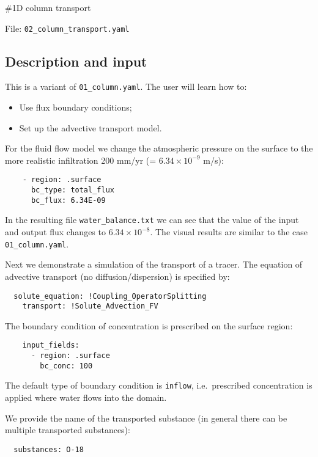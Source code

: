 \#1D column transport

File: \texttt{02\_column\_transport.yaml}

\subsection{Description and input}

This is a variant of \texttt{01\_column.yaml}. The user will learn how
to:

\begin{itemize}
\tightlist
\item
  Use flux boundary conditions;
\item
  Set up the advective transport model.
\end{itemize}

For the fluid flow model we change the atmospheric pressure on the
surface to the more realistic infiltration 200 mm/yr (=
\(6.34\times 10^{-9}\) m/s):

\begin{verbatim}
    - region: .surface
      bc_type: total_flux
      bc_flux: 6.34E-09
\end{verbatim}

In the resulting file \texttt{water\_balance.txt} we can see that the
value of the input and output flux changes to \(6.34 \times 10^{-8}\).
The visual results are similar to the case \texttt{01\_column.yaml}.

Next we demonstrate a simulation of the transport of a tracer. The
equation of advective transport (no diffusion/dispersion) is specified
by:

\begin{verbatim}
  solute_equation: !Coupling_OperatorSplitting
    transport: !Solute_Advection_FV
\end{verbatim}

The boundary condition of concentration is prescribed on the surface
region:

\begin{verbatim}
    input_fields:
      - region: .surface
        bc_conc: 100
\end{verbatim}

The default type of boundary condition is \texttt{inflow},
i.e.~prescribed concentration is applied where water flows into the
domain.

We provide the name of the transported substance (in general there can
be multiple transported substances):

\begin{verbatim}
  substances: O-18
\end{verbatim}

